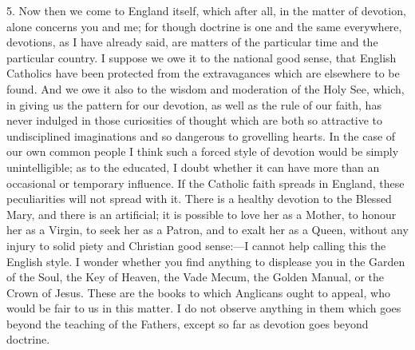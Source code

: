 5. Now then we come to England itself, which after all, in the matter
of devotion, alone concerns you and me; for though doctrine is one and
the same everywhere, devotions, as I have already said, are matters of
the particular time and the particular country. I suppose we owe it to
the national good sense, that English Catholics have been protected from
the extravagances which are elsewhere to be found. And we owe it also to
the wisdom and moderation of the Holy See, which, in giving us the
pattern for our devotion, as well as the rule of our faith, has
never indulged in those curiosities of thought which are both so
attractive to undisciplined imaginations and so dangerous to grovelling
hearts. In the case of our own common people I think such a forced style
of devotion would be simply unintelligible; as to the educated, I doubt
whether it can have more than an occasional or temporary influence. If
the Catholic faith spreads in England, these peculiarities will not
spread with it. There is a healthy devotion to the Blessed Mary, and
there is an artificial; it is possible to love her as a Mother, to
honour her as a Virgin, to seek her as a Patron, and to exalt her as a
Queen, without any injury to solid piety and Christian good sense:—I
cannot help calling this the English style. I wonder whether you find
anything to displease you in the Garden of the Soul, the Key of Heaven,
the Vade Mecum, the Golden Manual, or the Crown of Jesus. These are the
books to which Anglicans ought to appeal, who would be fair to us in
this matter. I do not observe anything in them which goes beyond the
teaching of the Fathers, except so far as devotion goes beyond doctrine.

